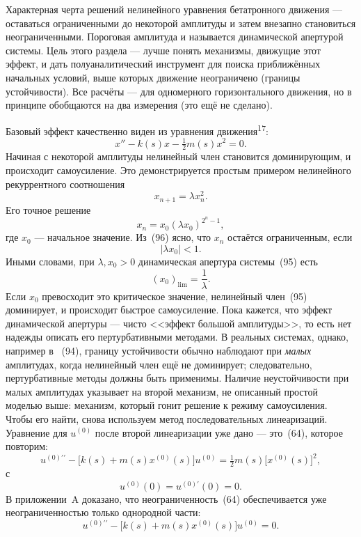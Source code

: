 \documentclass[11pt,a4paper]{article}
\begin{document}
Характерная черта решений нелинейного уравнения бетатронного движения ---
оставаться ограниченными до некоторой амплитуды и затем внезапно становиться
неограниченными. Пороговая амплитуда и называется динамической апертурой
системы. Цель этого раздела --- лучше понять механизмы, движущие этот эффект, и
дать полуаналитический инструмент для поиска приближённых начальных условий,
выше которых движение неограничено (границы устойчивости). Все расчёты --- для
одномерного горизонтального движения, но в принципе обобщаются на два измерения
(это ещё не сделано).

Базовый эффект качественно виден из уравнения движения\textsuperscript{17}:
\begin{equation}
x''-k(s)x-\tfrac12 m(s)x^2=0.
\end{equation}
Начиная с некоторой амплитуды нелинейный член становится доминирующим, и
происходит самоусиление. Это демонстрируется простым примером нелинейного
рекуррентного соотношения
\begin{equation}
x_{n+1}=\lambda x_n^2.
\end{equation}
Его точное решение
\begin{equation}
x_n=x_0(\lambda x_0)^{2^n-1},
\end{equation}
где $x_0$ --- начальное значение. Из~(96) ясно, что $x_n$ остаётся ограниченным,
если
\begin{equation}
|\lambda x_0|<1.
\end{equation}
Иными словами, при $\lambda,x_0>0$ динамическая апертура системы~(95) есть
\begin{equation}
(x_0)_{\mathrm{lim}}=\frac1\lambda.
\end{equation}
Если $x_0$ превосходит это критическое значение, нелинейный член~(95)
доминирует, и происходит быстрое самоусиление. Пока кажется, что эффект
динамической апертуры --- чисто <<эффект большой амплитуды>>, то есть нет надежды
описать его пертурбативными методами. В реальных системах, однако, например в
~(94), границу устойчивости обычно наблюдают при \emph{малых} амплитудах, когда
нелинейный член ещё не доминирует; следовательно, пертурбативные методы должны
быть применимы. Наличие неустойчивости при малых амплитудах указывает на второй
механизм, не описанный простой моделью выше: механизм, который гонит решение к
режиму самоусиления. Чтобы его найти, снова используем метод последовательных
линеаризаций. Уравнение для $u^{(0)}$ после второй линеаризации уже дано ---
это~(64), которое повторим:
\begin{equation}
u^{(0)\prime\prime}-\bigl[k(s)+m(s)x^{(0)}(s)\bigr]u^{(0)}
=\tfrac12 m(s)\bigl[x^{(0)}(s)\bigr]^2,
\tag{64}
\end{equation}
с
\begin{equation}
u^{(0)}(0)=u^{(0)\prime}(0)=0.
\tag{65}
\end{equation}
В приложении~A доказано, что неограниченность~(64) обеспечивается уже
неограниченностью только однородной части:
\begin{equation}
u^{(0)\prime\prime}-\bigl[k(s)+m(s)x^{(0)}(s)\bigr]u^{(0)}=0.
\end{equation}
\end{document}
